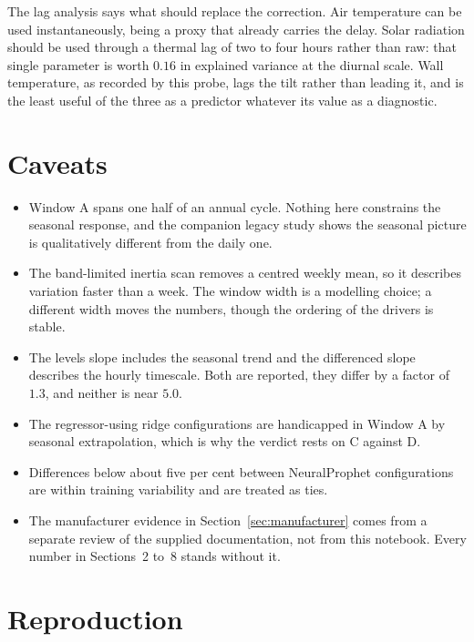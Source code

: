 \documentclass[11pt,a4paper]{article}
\begin{document}
The lag analysis says what should replace the correction. Air temperature can be used
instantaneously, being a proxy that already carries the delay. Solar radiation should be
used through a thermal lag of two to four hours rather than raw: that single parameter
is worth $0.16$ in explained variance at the diurnal scale. Wall temperature, as
recorded by this probe, lags the tilt rather than leading it, and is the least useful of
the three as a predictor whatever its value as a diagnostic.

\section{Caveats}

\begin{itemize}
\item Window A spans one half of an annual cycle. Nothing here constrains the seasonal
response, and the companion legacy study shows the seasonal picture is qualitatively
different from the daily one.
\item The band-limited inertia scan removes a centred weekly mean, so it describes
variation faster than a week. The window width is a modelling choice; a different width
moves the numbers, though the ordering of the drivers is stable.
\item The levels slope includes the seasonal trend and the differenced slope describes
the hourly timescale. Both are reported, they differ by a factor of $1.3$, and neither
is near $5.0$.
\item The regressor-using ridge configurations are handicapped in Window A by seasonal
extrapolation, which is why the verdict rests on C against D.
\item Differences below about five per cent between NeuralProphet configurations are
within training variability and are treated as ties.
\item The manufacturer evidence in Section~\ref{sec:manufacturer} comes from a separate
review of the supplied documentation, not from this notebook. Every number in
Sections~2 to~8 stands without it.
\end{itemize}

\appendix
\section{Reproduction}
\end{document}
